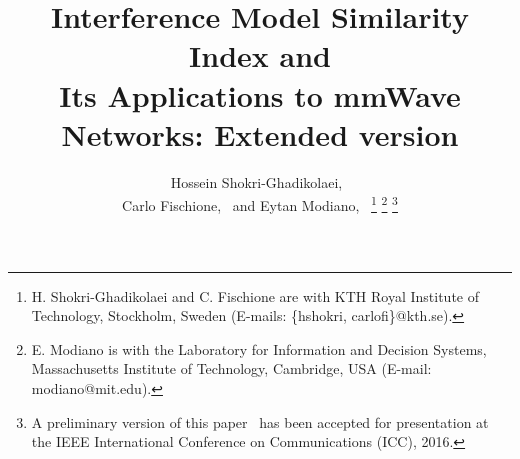 \documentclass[12pt, draftclsnofoot, onecolumn]{IEEEtran}
\begin{document}
\title{Interference Model Similarity Index and\\ Its Applications to mmWave Networks: Extended version}

\author{Hossein Shokri-Ghadikolaei,~ \\ Carlo Fischione,~ and Eytan Modiano,~ %
\thanks{H. Shokri-Ghadikolaei and C. Fischione are with KTH Royal Institute of Technology, Stockholm,
Sweden (E-mails: \{hshokri, carlofi\}@kth.se).}
\thanks{E. Modiano is with the Laboratory for Information and Decision Systems, Massachusetts Institute of Technology, Cambridge, USA (E-mail: modiano@mit.edu).}
\thanks{A preliminary version of this paper~\cite{Shokri2016OntheAccuracy} has been accepted for presentation at the IEEE International Conference on Communications (ICC), 2016.}
}



\maketitle

\vspace{-7mm}
\end{document}
